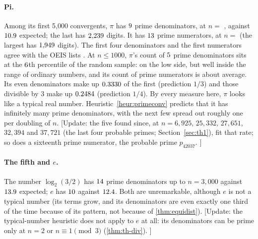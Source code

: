 \paragraph{Pi.} Among its first 5{,}000 convergents, $\pi$ has $9$ prime denominators, at $n =$ \PiQIdx, against $10.9$ expected; the last has $2{,}239$ digits. It has $13$ prime numerators, at $n =$ \PiPIdx{} (the largest has $1{,}949$ digits). The first four denominators and the first numerators agree with the OEIS lists \citep{OEIS_A086788,OEIS_A086785}. At $n \le 1000$, $\pi$'s count of $5$ prime denominators sits at the $6$th percentile of the random sample: on the low side, but well inside the range of ordinary numbers, and its count of prime numerators is about average. Its even denominators make up $0.3330$ of the first \NT{} (prediction $1/3$) and those divisible by 3 make up $0.2484$ (prediction $1/4$). By every measure here, $\pi$ looks like a typical real number. Heuristic~\ref{heur:primeconv} predicts that it has infinitely many prime denominators, with the next few spread out roughly one per doubling of $n$. [Update: the five found since, at $n = 6{,}925$, $25{,}332$, $27{,}651$, $32{,}394$ and $37{,}721$ (the last four probable primes; Section~\ref{sec:th1}), fit that rate; so does a sixteenth prime numerator, the probable prime $p_{42037}$. \addedon{\revC}]

\paragraph{The fifth and $e$.} The number $\log_2(3/2)$ has $14$ prime denominators up to $n = 3{,}000$ against $13.9$ expected; $e$ has $10$ against $12.4$. Both are unremarkable, although $e$ is not a typical number (its terms grow, and its denominators are even exactly one third of the time because of its pattern, not because of \cref{thm:equidist}). [Update: the typical-number heuristic does not apply to $e$ at all: its denominators can be prime only at $n = 2$ or $n \equiv 1 \pmod 3$ (\cref{thm:th-div}). \addedon{\revC}]

